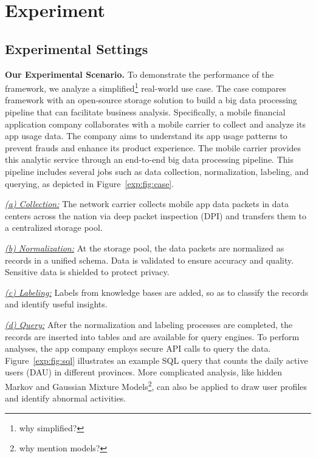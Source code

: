 \section{Experiment} 
\label{sec:exp}

\subsection{Experimental Settings}


\noindent \textbf{Our Experimental Scenario.} To demonstrate the performance of the \sys framework, we  analyze a simplified\footnote{why simplified?} real-world use case. The case compares  \sys framework with an open-source storage solution to build a big data processing pipeline that can facilitate business analysis. Specifically, a mobile financial application company collaborates with a mobile carrier to collect and analyze its app usage data. The company aims to understand its app usage patterns to prevent frauds and enhance its product experience. The mobile carrier provides this analytic service through an end-to-end big data processing pipeline. This pipeline includes several jobs such as data collection, normalization, labeling, and querying, as depicted in Figure~\ref{exp:fig:case}.

\noindent \underline{\textit{(a) Collection:}}  The network carrier collects mobile app data packets in  data centers across the nation via deep packet inspection (DPI) and transfers them to a centralized storage pool.

\noindent \underline{\textit{(b) Normalization:}} At the  storage pool, the data packets are normalized as records in a unified schema. Data is validated to ensure accuracy and quality. Sensitive data is shielded to protect  privacy. 

\noindent \underline{\textit{(c) Labeling:}} Labels from knowledge bases are added, so as to classify the records and identify useful insights.

\noindent \underline{\textit{(d) Query:}} After the normalization and labeling processes are completed, the  records are inserted into tables and are available for query engines. To perform analyses, the app company employs secure API calls to query the data. Figure~\ref{exp:fig:sql} illustrates an example SQL query that counts the daily active users (DAU) in different provinces. More complicated analysis, like hidden Markov and Gaussian Mixture Models\footnote{why mention models?}, can also be applied to draw user profiles and identify abnormal activities.

